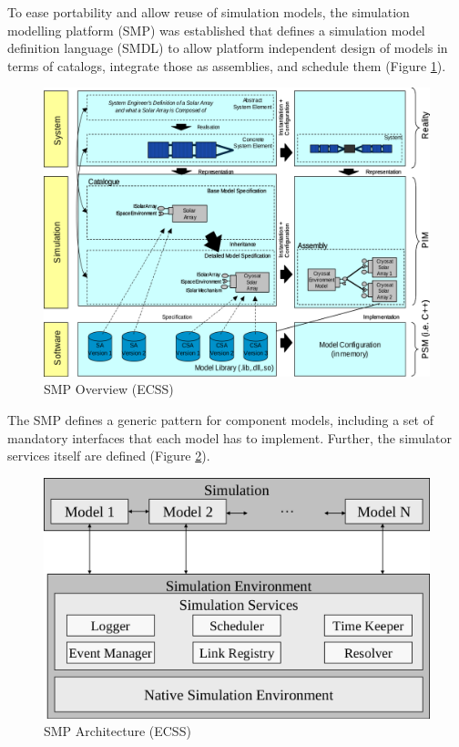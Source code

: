 To ease portability and allow reuse of simulation models, the simulation modelling platform (SMP) was established that defines a simulation model definition language (SMDL) to allow platform independent design of models in terms of catalogs, integrate those as assemblies, and schedule them (Figure \ref{fig:SMP Overview}). 

\begin{figure}[h]
\centering\includegraphics[scale=0.35]{fig/smp_overview}
\caption{SMP Overview (ECSS)}
\label{fig:SMP Overview}
\end{figure}

The SMP defines a generic pattern for component models, including a set of mandatory interfaces that each model has to implement. Further, the simulator services itself are defined (Figure \ref{fig:SMP Architecture}).

\begin{figure}[h]
\centering\includegraphics[scale=0.3]{fig/smp_architecture}
\caption{SMP Architecture (ECSS)}
\label{fig:SMP Architecture}
\end{figure}
